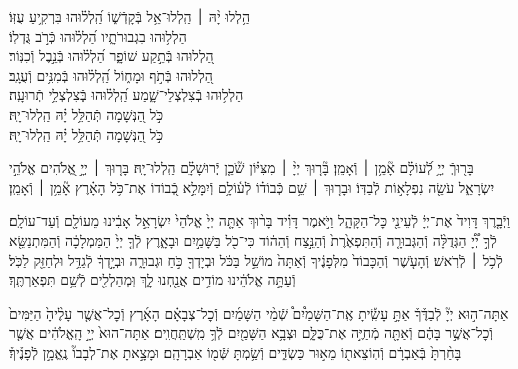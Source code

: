 \documentclass[twoside, openany, parskip=half, 11pt]{book}
\begin{document}
\begin{narrow}
הַ֥לְלוּ יָ֨הּ ׀ \hfill \break
הַֽלְלוּ־אֵ֥ל בְּֿקָדְֿשׁ֑וֹ \hfill הַֽ֝לְל֗וּהוּ בִּרְקִ֥יעַ עֻזּֽוֹ׃ \\
הַלְל֥וּהוּ בִגְבוּרֹתָ֑יו \hfill הַ֝לְל֗וּהוּ כְּֿרֹ֣ב גֻּדְלֽוֹ׃ \\
הַ֭לְלוּהוּ בְּֿתֵ֣קַע שׁוֹפָ֑ר \hfill הַ֝לְל֗וּהוּ בְּֿנֵ֣בֶל וְֿכִנּֽוֹר׃ \\
הַ֭לְלוּהוּ בְּֿתֹ֣ף וּמָח֑וֹל \hfill הַֽ֝לְל֗וּהוּ בְּֿמִנִּ֥ים וְֿעֻגָֽב׃ \\
הַלְל֥וּהוּ בְֿצִלְצְלֵי־שָׁ֑מַע \hfill הַֽ֝לְל֗וּהוּ בְּֽֿצִלְצְלֵ֥י תְֿרוּעָֽה׃ \\
כֹּ֣ל הַ֭נְּשָׁמָה תְּֿהַלֵּ֥ל יָ֗הּ \hfill הַֽלְלוּ־יָֽהּ׃ \\
\scriptsize{כֹּ֣ל הַ֭נְּשָׁמָה תְּֿהַלֵּ֥ל יָ֗הּ \hfill הַֽלְלוּ־יָֽהּ׃ \\}
\normalsize{}

\end{narrow}



בָּר֖וּךְֿ
יְיָ֥ לְֿ֝עוֹלָ֗ם אָ֘מֵ֥ן ׀ וְֿאָמֵֽן׃
בָּ֘ר֤וּךְ יְיָ֨ ׀ מִצִּיּ֗וֹן שֹׁ֘כֵ֤ן יְֽֿרוּשָׁלָ֗‍ִם הַֽלְלוּ־יָֽהּ׃
בָּר֤וּךְ ׀ יְיָ֣ אֱ֭לֹהִים אֱלֹהֵ֣י יִשְׂרָאֵ֑ל עֹשֵׂ֖ה נִפְלָא֣וֹת לְֿבַדּֽוֹ׃
וּבָר֤וּךְ ׀ שֵׁ֥ם כְּֿבוֹד֗וֹ לְֿע֫וֹלָ֥ם וְֿיִמָּלֵ֣א כְֿ֭בוֹדוֹ אֶת־כֹּ֥ל הָאָ֗רֶץ אָ֘מֵ֥ן ׀ וְֿאָמֵֽן׃





וַיְֿבָ֤רֶךְ
דָּוִיד֙ אֶת־יְיָ֔ לְֿעֵינֵ֖י כׇּל־הַקָּהָ֑ל וַיֹּ֣אמֶר דָּוִ֗יד בָּר֨וּךְ אַתָּ֤ה יְיָ֙ אֱלֹהֵי֙ יִשְׂרָאֵ֣ל אָבִ֔ינוּ מֵעוֹלָ֖ם וְֿעַד־עוֹלָֽם׃
לְֿךָ֣ יְ֠יָ֠ הַגְּדֻלָּ֨ה וְֿהַגְּבוּרָ֤ה וְֿהַתִּפְאֶ֙רֶת֙ וְֿהַנֵּ֣צַח וְֿהַה֔וֹד כִּי־כֹ֖ל בַּשָּׁמַ֣יִם וּבָאָ֑רֶץ לְֿךָ֤ יְיָ֙ הַמַּמְלָכָ֔ה וְֿהַמִּתְנַשֵּׂ֖א לְֿכֹ֥ל ׀ לְֿרֹֽאשׁ׃
וְֿהָעֹ֤שֶׁר וְֿהַכָּבוֹד֙ מִלְּפָנֶ֔יךָ וְֿאַתָּה֙ מוֹשֵׁ֣ל בַּכֹּ֔ל וּבְיָדְךָ֖ כֹּ֣חַ וּגְבוּרָ֑ה וּבְיָ֣דְךָ֔ לְֿגַדֵּ֥ל וּלְחַזֵּ֖ק לַכֹּֽל׃
וְֿעַתָּ֣ה אֱלֹהֵ֔ינוּ מוֹדִ֥ים אֲנַ֖חְנוּ לָ֑ךְ וּֽמְהַלְלִ֖ים לְֿשֵׁ֥ם תִּפְאַרְתֶּֽךָ׃



אַתָּה־ה֣וּא
יְיָ֘ לְֿבַדֶּ֒ךָ֒ אַתָּ֣ עָשִֽׂ֡יתָ אֶֽת־הַשָּׁמַ֩יִם֩ שְֿׁמֵ֨י הַשָּׁמַ֜יִם וְֿכׇל־צְבָאָ֗ם הָאָ֜רֶץ וְֿכׇל־אֲשֶׁ֤ר עָלֶ֨יהָ֙ הַיַּמִּים֙ וְֿכׇל־אֲשֶׁ֣ר בָּהֶ֔ם וְֿאַתָּ֖ה מְֿחַיֶּ֣ה אֶת־כֻּלָּ֑ם וּצְבָ֥א הַשָּׁמַ֖יִם לְֿךָ֥ מִֽשְׁתַּֽחֲוִֽים׃
אַתָּה־הוּא֙ יְיָ֣ הָֽאֱלֹהִ֔ים אֲשֶׁ֤ר בָּחַ֨רְתָּ֙ בְּֿאַבְרָ֔ם וְֿהֽוֹצֵאת֖וֹ מֵא֣וּר כַּשְׂדִּ֑ים וְֿשַׂ֥מְתָּ שְּֿׁמ֖וֹ אַבְרָהָֽם׃ וּמָצָ֣אתָ אֶת־לְבָבוֹ֘ נֶֽאֱמָ֣ן לְֿפָנֶ֒יךָ֒׃
\end{document}
